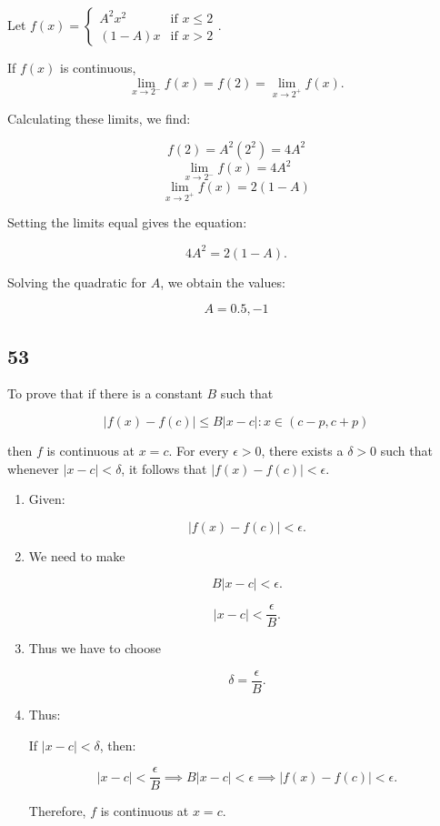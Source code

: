 \documentclass{article}
\begin{document}
Let \( f(x) = 
\begin{cases} 
A^2 x^2 & \text{if } x \leq 2 \\ 
(1-A)x & \text{if } x > 2 
\end{cases} \). 


If $f(x)$ is continuous,
\[
\lim_{x \to 2^-} f(x) = f(2) = \lim_{x \to 2^+} f(x).
\]

Calculating these limits, we find:

\[ f(2) = A^2(2^2) = 4A^2 \]
\[ \lim_{x \to 2^-} f(x) = 4A^2 \]
\[ \lim_{x \to 2^+} f(x) = 2(1-A) \]

Setting the limits equal gives the equation:

\[
4A^2 = 2(1-A).
\]

Solving the quadratic for \( A \), we obtain the values:

\[
A = 0.5, -1
\]


\subsection*{53}

To prove that if there is a constant \( B \) such that 

\[
|f(x) - f(c)| \leq B |x - c| :  x \in (c - p, c + p) 
\]

\noindent then \( f \) is continuous at \( x = c \).
\bigbreak
\noindent For every \( \epsilon > 0 \), there exists a \( \delta > 0 \) such that whenever \( |x - c| < \delta \), it follows that \( |f(x) - f(c)| < \epsilon \).
\begin{enumerate}


    \item Given: 

    \[
    |f(x) - f(c)| < \epsilon.
    \]

    \item We need to make

    \[
    B |x - c| < \epsilon.
    \]

    \[
    |x - c| < \frac{\epsilon}{B}.
    \]

    \item Thus we have to choose 

    \[
    \delta = \frac{\epsilon}{B}.
    \]

    \item Thus: 
    
    If \( |x - c| < \delta \), then:

    \[
    |x - c| < \frac{\epsilon}{B} \implies B |x - c| < \epsilon \implies |f(x) - f(c)| < \epsilon.
    \]

  Therefore, \( f \) is continuous at \( x = c \).
\end{enumerate}
\end{document}
